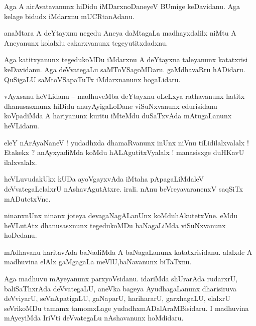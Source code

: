\documentclass{article}
\begin{document}
\begin{mng}%
Aga A airAvatavanunx hiDidu iMDarxnoDaneyeV BUmige keDavidanu. Aga kelage bidudx iMdarxnu 
mUCRtanAdanu.
\end{mng}

\begin{mng}%
anaMtara A deYtayxnu negedu Aneya daMtagaLa madhayxdalilx niMtu A Aneyanunx kolalxlu cakarxvanunx 
tegeyutitxdadxnu.
\end{mng}

\begin{mng}%
Aga katitxyanunx tegedukoMDu iMdarxnu A deYtayxna  taleyanunx katatxrisi keDavidanu. Aga 
deVvategaLu saMToVSagoMDaru. gaMdhavaRru hADidaru. QuSigaLU saMtoVSapaTuTx iMdarxnanunx hogaLidaru.
\end{mng}


\begin{mng}%
vAyxsanu heVLidanu -- madhuveMba deYtayxnu oLeLxya rathavanunx hatitx dhanusasxnunx hiDidu 
anuyAyigaLoDane viSuNxvanunx edurisidanu koVpadiMda A hariyanunx kuritu iMteMdu duSaTxvAda 
mAtugaLanunx heVLidanu.
\end{mng}

\begin{mng}%
eleY nArAyaNaneV ! yudadhxda dhamaRvanunx inUnx niVnu tiLidilalxvalalx ! Etakekx ? anAyxyadiMda 
koMdu hALAgutitxVyalalx ! manasisxge duHKavU ilalxvalalx.
\end{mng}

\begin{mng}%
heVLuvudakUkx kUDa ayoVgayxvAda iMtaha pApagaLiMdaleV deVvategaLelalxrU nAshavAgutAtxre. irali. 
nAnu beVreyavaranenxV saqSiTx mADutetxVne.
\end{mng}

\begin{mng}%
ninanxnUnx ninanx joteya devagaNagALanUnx koMduhAkutetxVne. eMdu heVLutAtx dhanusasxnunx 
tegedukoMDu baNagaLiMda viSuNxvanunx hoDedanu.
\end{mng}

\begin{mng}%
mAdhavanu haritavAda baNadiMda A baNagaLanunx katatxrisidanu. alalxde A madhuvina elAlx  gaMgagaLa 
meVlU,baNavanunx biTaTxnu.
\end{mng}

\begin{mng}%
Aga madhuvu mAyeyanunx parxyoVsidanu. idariMda shUrarAda rudarxrU, baliSaThxrAda deVvategaLU, 
aneVka bageya AyudhagaLanunx dharisiruva deVviyarU, seVnApatigaLU, gaNaparU, harihararU, 
garxhagaLU, elalxrU seVrikoMDu tamamx tamomxLage yudadhxmADalAraMBisidaru. I madhuvina mAyeyiMda 
IriVti deVvategaLu nAshavanunx hoMdidaru.
\end{mng}
\end{document}
